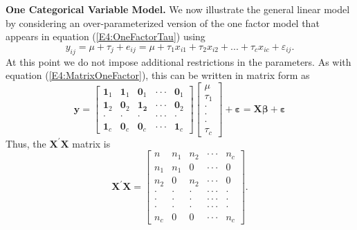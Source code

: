 \textbf{One Categorical Variable Model.} We now illustrate the
general linear model by considering an over-parameterized version of
the one factor model that appears in equation
(\ref{E4:OneFactorTau}) using
\begin{equation*}
y_{ij}=\mu +\tau _{j}+e_{ij}=\mu +\tau _{1}x_{i1}+\tau
_{2}x_{i2}+...+\tau _{c}x_{ic}+\varepsilon_{ij}.
\end{equation*}
At this point we do not impose additional restrictions in the
parameters. As with equation (\ref{E4:MatrixOneFactor}), this can be
written in matrix form as
\begin{equation*}
\mathbf{y}=
\begin{bmatrix}
\mathbf{1}_1 & \mathbf{1}_1 & \mathbf{0}_1 & \cdot
\cdot \cdot  & \mathbf{0}_1 \\
\mathbf{1}_2 & \mathbf{0}_2 & \mathbf{1}_{\mathbf{2}} & \cdot
\cdot \cdot  & \mathbf{0}_2 \\
\cdot  & \cdot  & \cdot  & \cdot \cdot \cdot  & \cdot  \\
\mathbf{1}_c & \mathbf{0}_c & \mathbf{0}_c & \cdot \cdot \cdot  &
\mathbf{1}_c
\end{bmatrix}
\begin{bmatrix}
\mu  \\
\tau _{1} \\
\cdot  \\
\cdot  \\
\cdot  \\
\tau _{c}
\end{bmatrix}
+\boldsymbol \varepsilon = \mathbf{X \boldsymbol \beta +\boldsymbol
\varepsilon}
\end{equation*}
Thus, the $\mathbf{X}^{\prime }\mathbf{X}$ matrix is
\begin{equation*}
\mathbf{X}^{\prime }\mathbf{X}=%
\begin{bmatrix}
n & n_1 & n_2 & \cdot \cdot \cdot  & n_c \\
n_1 & n_1 & 0 & \cdot \cdot \cdot  & 0 \\
n_{2} & 0 & n_2 & \cdot \cdot \cdot  & 0 \\
\cdot  & \cdot  & \cdot  & \cdot \cdot \cdot  & \cdot  \\
\cdot  & \cdot  & \cdot  & \cdot \cdot \cdot  & \cdot  \\
\cdot  & \cdot  & \cdot  & \cdot \cdot \cdot  & \cdot  \\
n_c & 0 & 0 & \cdot \cdot \cdot  & n_c%
\end{bmatrix}.
\end{equation*}

